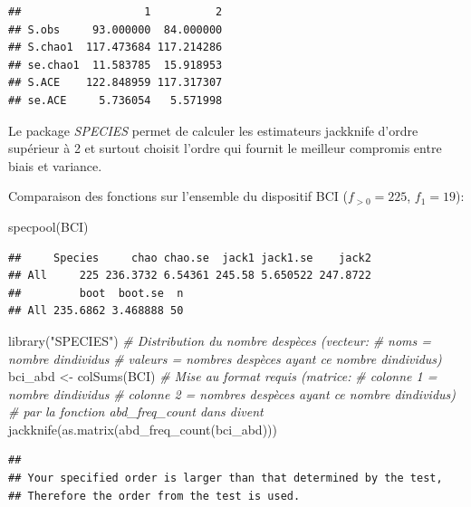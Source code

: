\documentclass[
  11pt,
  american,
  a4paper,
  extrafontsizes,onecolumn,openright
  ]{memoir}
\newenvironment{Shaded}{\begin{snugshade}}{\end{snugshade}}
\newcommand{\CommentTok}[1]{\textcolor[rgb]{0.56,0.35,0.01}{\textit{#1}}}
\newcommand{\FunctionTok}[1]{\textcolor[rgb]{0.00,0.00,0.00}{#1}}
\newcommand{\NormalTok}[1]{#1}
\newcommand{\OtherTok}[1]{\textcolor[rgb]{0.56,0.35,0.01}{#1}}
\newcommand{\StringTok}[1]{\textcolor[rgb]{0.31,0.60,0.02}{#1}}
\begin{document}
\begin{verbatim}
##                   1          2
## S.obs     93.000000  84.000000
## S.chao1  117.473684 117.214286
## se.chao1  11.583785  15.918953
## S.ACE    122.848959 117.317307
## se.ACE     5.736054   5.571998
\end{verbatim}

\normalsize

Le package \emph{SPECIES} \autocite{Wang2011} permet de calculer les estimateurs jackknife d'ordre supérieur à 2 et surtout choisit l'ordre qui fournit le meilleur compromis entre biais et variance.

Comparaison des fonctions sur l'ensemble du dispositif BCI (\(f_{>0}=225\), \(f_1=19\)):

\scriptsize

\begin{Shaded}
\begin{Highlighting}[]
\FunctionTok{specpool}\NormalTok{(BCI)}
\end{Highlighting}
\end{Shaded}

\begin{verbatim}
##     Species     chao chao.se  jack1 jack1.se    jack2
## All     225 236.3732 6.54361 245.58 5.650522 247.8722
##         boot  boot.se  n
## All 235.6862 3.468888 50
\end{verbatim}

\begin{Shaded}
\begin{Highlighting}[]
\FunctionTok{library}\NormalTok{(}\StringTok{"SPECIES"}\NormalTok{)}
\CommentTok{\# Distribution du nombre d\textquotesingle{}espèces (vecteur: }
\CommentTok{\# noms = nombre d\textquotesingle{}individus}
\CommentTok{\# valeurs = nombres d\textquotesingle{}espèces ayant ce nombre d\textquotesingle{}individus)}
\NormalTok{bci\_abd }\OtherTok{\textless{}{-}} \FunctionTok{colSums}\NormalTok{(BCI)}
\CommentTok{\# Mise au format requis (matrice:}
\CommentTok{\# colonne 1 = nombre d\textquotesingle{}individus}
\CommentTok{\# colonne 2 = nombres d\textquotesingle{}espèces ayant ce nombre d\textquotesingle{}individus)}
\CommentTok{\# par la fonction abd\_freq\_count dans divent}
\FunctionTok{jackknife}\NormalTok{(}\FunctionTok{as.matrix}\NormalTok{(}\FunctionTok{abd\_freq\_count}\NormalTok{(bci\_abd)))}
\end{Highlighting}
\end{Shaded}

\begin{verbatim}
## 
## Your specified order is larger than that determined by the test, 
## Therefore the order from the test is used.
\end{verbatim}
\end{document}
